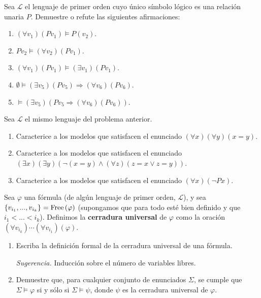 \documentclass[12pt]{report}
\theoremstyle{largebreak}
\newcommand{\free}{\textup{Free}}
\begin{document}
    \begin{excer}
        Sea $\mathcal{L}$ el lenguaje de primer orden cuyo único símbolo lógico es una relación unaria $P$. Demuestre o refute las siguientes afirmaciones:
        \begin{enumerate}[label=$(\alph*)$]
            \item $(\forall v_1)(Pv_1)\vDash P(v_2)$.
            \item $Pv_2\vDash(\forall v_2)(Pv_1)$.
            \item $(\forall v_1)(Pv_1)\vDash(\exists v_1)(Pv_1)$.
            \item $\emptyset\vDash(\exists v_5)(Pv_5)\Rightarrow(\forall v_6)(Pv_6)$.
            \item $\vDash(\exists v_5)(Pv_5\Rightarrow(\forall v_6)(Pv_6))$.
        \end{enumerate}
    \end{excer}

    \begin{sol}
    \end{sol}

    \begin{excer}
        Sea $\mathcal{L}$ el mismo lenguaje del problema anterior.
        \begin{enumerate}[label=$(\alph*)$]
            \item Caracterice a los modelos que satisfacen el enunciado $(\forall x)(\forall y)(x=y)$.
            \item Caracterice a los modelos que satisfacen el enunciado $(\exists x)(\exists y)(\neg(x=y)\land(\forall z)(z=x\lor z=y))$.
            \item Caracterice a los modelos que satisfacen el enunciado $(\forall x)(\neg Px)$.
        \end{enumerate}
    \end{excer}

    \begin{sol}
    \end{sol}

    \begin{excer}
        Sea $\varphi$ una fórmula (de algún lenguaje de primer orden, $\mathcal{L}$), y sea $\left\{v_{ i_1},...,v_{ i_k} \right\}=\free\left(\varphi\right)$ (supongamos que para todo esté bien definido y que $i_1<...<i_k$). Definimos la \textbf{cerradura universal} de $\varphi$ como la oración $(\forall v_{ i_k})\cdots(\forall v_{ i_1})(\varphi)$.
        \begin{enumerate}[label=$(\alph*)$]
            \item Escriba la definición formal de la cerradura universal de una fórmula.
            
            \textit{Sugerencia.} Inducción sobre el número de variables libres.
            \item Demuestre que, para cualquier conjunto de enunciados $\Sigma$, se cumple que $\Sigma\vDash\varphi$ si y sólo si $\Sigma\vDash\psi$, donde $\psi$ es la cerradura universal de $\varphi$.
        \end{enumerate}
    \end{excer}
\end{document}
